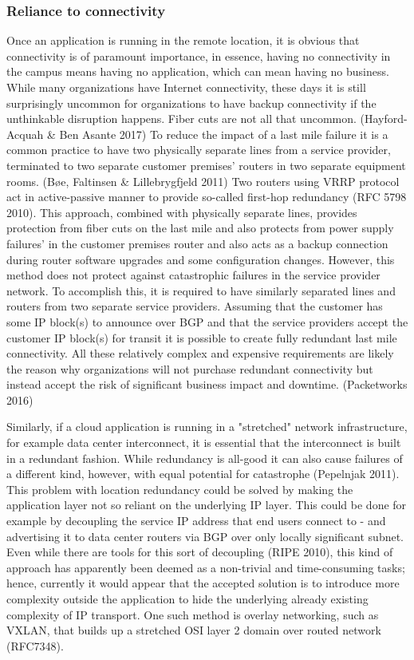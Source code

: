 \documentclass{article}
\begin{document}
\subsubsection{Reliance to connectivity}
Once an application is running in the remote location, it is obvious that connectivity is of paramount importance, in essence, having no connectivity in the campus means having no application, which can mean having no business. While many organizations have Internet connectivity, these days it is still surprisingly uncommon for organizations to have backup connectivity if the unthinkable disruption happens. Fiber cuts are not all that uncommon. (Hayford-Acquah \& Ben Asante 2017)
To reduce the impact of a last mile failure it is a common practice to have two physically separate lines from a service provider, terminated to two separate customer premises' routers in two separate equipment rooms. (Bøe, Faltinsen \& Lillebrygfjeld 2011) Two routers using VRRP protocol act in active-passive manner to provide so-called first-hop redundancy (RFC 5798 2010). This approach, combined with physically separate lines, provides protection from fiber cuts on the last mile and also protects from power supply failures' in the customer premises router and also acts as a backup connection during router software upgrades and some configuration changes.
However, this method does not protect against catastrophic failures in the service provider network. To accomplish this, it is required to have similarly separated lines and routers from two separate service providers. Assuming that the customer has some IP block(s) to announce over BGP and that the service providers accept the customer IP block(s) for transit it is possible to create fully redundant last mile connectivity. All these relatively complex and expensive requirements are likely the reason why organizations will not purchase redundant connectivity but instead accept the risk of significant business impact and downtime. (Packetworks 2016)
\par
Similarly, if a cloud application is running in a "stretched" network infrastructure, for example data center interconnect, it is essential that the interconnect is built in a redundant fashion. While redundancy is all-good it can also cause failures of a different kind, however, with equal potential for catastrophe (Pepelnjak 2011).
This problem with location redundancy could be solved by making the application layer not so reliant on the underlying IP layer. This could be done for example by decoupling the service IP address that end users connect to - and advertising it to data center routers via BGP over only locally significant subnet. Even while there are tools for this sort of decoupling (RIPE 2010), this kind of approach has apparently been deemed as a non-trivial and time-consuming tasks; hence, currently it would appear that the accepted solution is to introduce more complexity outside the application to hide the underlying already existing complexity of IP transport. One such method is overlay networking, such as VXLAN, that builds up a stretched OSI layer 2 domain over routed network (RFC7348).
\end{document}
